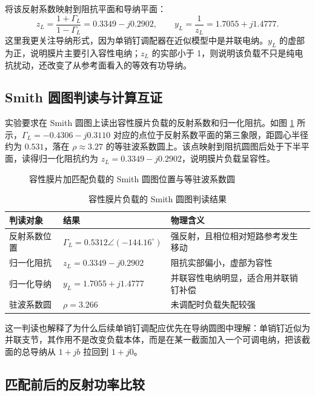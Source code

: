 \documentclass[UTF8]{ctexart}
\begin{document}
将该反射系数映射到阻抗平面和导纳平面：
\begin{equation}
  z_L=\frac{1+\Gamma_L}{1-\Gamma_L}=0.3349-j0.2902,
  \qquad
  y_L=\frac{1}{z_L}=1.7055+j1.4777.
  \label{eq:load-admittance}
\end{equation}
这里我更关注导纳形式，因为单销钉调配器在近似模型中是并联电纳。$y_L$ 的虚部为正，说明膜片主要引入容性电纳；$z_L$ 的实部小于 1，则说明该负载不只是纯电抗扰动，还改变了从参考面看入的等效有功导纳。

\subsection{Smith 圆图判读与计算互证}

实验要求在 Smith 圆图上读出容性膜片负载的反射系数和归一化阻抗。如图 \ref{fig:smith-load} 所示，$\Gamma_L=-0.4306-j0.3110$ 对应的点位于反射系数平面的第三象限，距圆心半径约为 $0.531$，落在 $\rho\approx3.27$ 的等驻波系数圆上。该点映射到阻抗圆图后处于下半平面，读得归一化阻抗约为 $z_L=0.3349-j0.2902$，说明膜片负载呈容性。

\begin{figure}[H]
  \centering
  \drawsmithchart
  \caption{容性膜片加匹配负载的 Smith 圆图位置与等驻波系数圆}
  \label{fig:smith-load}
\end{figure}

\begin{table}[H]
  \centering
  \caption{容性膜片负载的 Smith 圆图判读结果}
  \label{tab:smith-read}
  \begin{tabular}{lll}
    \toprule
    判读对象 & 结果 & 物理含义 \\
    \midrule
    反射系数位置 & $\Gamma_L=0.5312\angle(-144.16^\circ)$ & 强反射，且相位相对短路参考发生移动 \\
    归一化阻抗 & $z_L=0.3349-j0.2902$ & 阻抗实部偏小，虚部为容性 \\
    归一化导纳 & $y_L=1.7055+j1.4777$ & 并联容性电纳明显，适合用并联销钉补偿 \\
    驻波系数圆 & $\rho=3.266$ & 未调配时负载失配较强 \\
    \bottomrule
  \end{tabular}
\end{table}

这一判读也解释了为什么后续单销钉调配应优先在导纳圆图中理解：单销钉近似为并联支节，其作用不是改变负载本体，而是在某一截面加入一个可调电纳，把该截面的总导纳从 $1+jb$ 拉回到 $1+j0$。

\subsection{匹配前后的反射功率比较}
\end{document}
